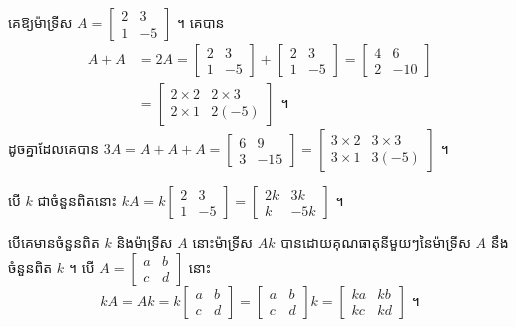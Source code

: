 \begin{example}[ឧទាហរណ៍ ១]
គេឱ្យម៉ាទ្រីស $A = \begin{bmatrix} 2 & 3\\ 1 & -5 \end{bmatrix}$ ។ គេបាន
\[
\begin{aligned}
A + A &= 2A = \begin{bmatrix} 2 & 3\\ 1 & -5 \end{bmatrix} + \begin{bmatrix} 2 & 3\\ 1 & -5 \end{bmatrix} = \begin{bmatrix} 4 & 6\\ 2 & -10 \end{bmatrix}\\
&= \begin{bmatrix} 2 \times 2 & 2 \times 3\\ 2 \times 1 & 2(-5) \end{bmatrix} \text{ ។}
\end{aligned}
\]
ដូចគ្នាដែលគេបាន $3A = A + A + A = \begin{bmatrix} 6 & 9\\ 3 & -15 \end{bmatrix} = \begin{bmatrix} 3 \times 2 & 3 \times 3\\ 3 \times 1 & 3(-5) \end{bmatrix}$ ។

បើ $k$ ជាចំនួនពិតនោះ $kA = k\begin{bmatrix} 2 & 3\\ 1 & -5 \end{bmatrix} = \begin{bmatrix} 2k & 3k\\ k & -5k \end{bmatrix}$ ។
\end{example}

\begin{formulaBox}[ជាទូទៅ]
បើគេមានចំនួនពិត $k$ និងម៉ាទ្រីស $A$ នោះម៉ាទ្រីស $Ak$ បានដោយគុណធាតុនីមួយៗនៃម៉ាទ្រីស $A$ នឹងចំនួនពិត $k$ ។ បើ $A = \begin{bmatrix} a & b\\ c & d \end{bmatrix}$ នោះ
\[ kA = Ak = k\begin{bmatrix} a & b\\ c & d \end{bmatrix} = \begin{bmatrix} a & b\\ c & d \end{bmatrix}k = \begin{bmatrix} ka & kb\\ kc & kd \end{bmatrix} \text{ ។} \]
\end{formulaBox}

